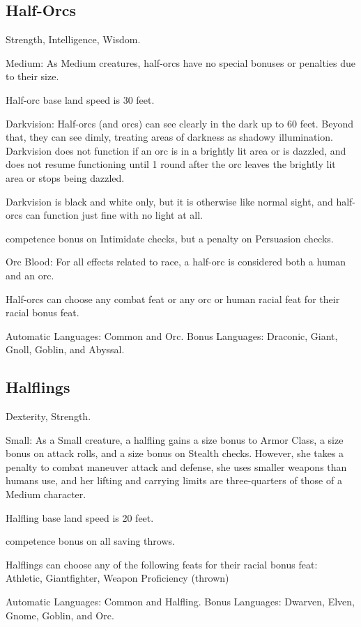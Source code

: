 \subsection{Half-Orcs}
\begin{itemize*}
\item {} Strength,  Intelligence,  Wisdom.
\item Medium: As Medium creatures, half-orcs have no special bonuses or penalties due to their size.
\item Half-orc base land speed is 30 feet.
\item Darkvision: Half-orcs (and orcs) can see clearly in the dark up to 60 feet.  Beyond that, they can see dimly, treating areas of darkness as shadowy illumination. Darkvision does not function if an orc is in a brightly lit area or is dazzled, and does not resume functioning until 1 round after the orc leaves the brightly lit area or stops being dazzled.
\par Darkvision is black and white only, but it is otherwise like normal
sight, and half-orcs can function just fine with no light at all.
\item {} competence bonus on Intimidate checks, but a  penalty on Persuasion checks.
\item Orc Blood: For all effects related to race, a half-orc is considered both a human and an orc.
\item Half-orcs can choose any combat feat or any orc or human racial feat for their racial bonus feat.
\item Automatic Languages: Common and Orc. Bonus Languages: Draconic, Giant, Gnoll, Goblin, and Abyssal.
\end{itemize*}

\subsection{Halflings}
\begin{itemize*}
\item {} Dexterity,  Strength.
\item Small: As a Small creature, a halfling gains a  size bonus to Armor Class, a  size bonus on attack rolls, and a  size bonus on Stealth checks. However, she takes a  penalty to combat maneuver attack and defense, she uses smaller weapons than humans use, and her lifting and carrying limits are three-quarters of those of a Medium character.
\item Halfling base land speed is 20 feet.
\item {} competence bonus on all saving throws.
\item Halflings can choose any of the following feats for their racial bonus feat: Athletic, Giantfighter, Weapon Proficiency (thrown)
\item Automatic Languages: Common and Halfling. Bonus Languages: Dwarven, Elven, Gnome, Goblin, and Orc.
\end{itemize*}

